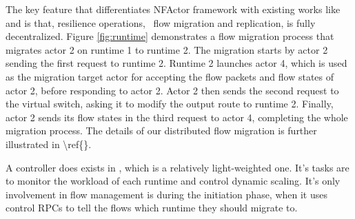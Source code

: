 The key feature that differentiates NFActor framework with existing works like \cite{gember2015opennf} and \cite{rajagopalan2013split} is that, resilience operations, \ie~flow migration and replication, is fully decentralized. Figure \ref{fig:runtime} demonstrates a flow migration process that migrates actor 2 on runtime 1 to runtime 2. \ac{The migration starts by actor 2 sending the first request to runtime 2. Runtime 2 launches actor 4, which is used as the migration target actor for accepting the flow packets and flow states of actor 2, before responding to actor 2. Actor 2 then sends the second request to the virtual switch, asking it to modify the output route to runtime 2. Finally, actor 2 sends its flow states in the third request to actor 4, completing the whole migration process. The details of our distributed flow migration is further illustrated in \ref{}.} 

A controller does exists in \nfactor, which is a relatively light-weighted one. It's tasks are to monitor the workload of each runtime and control dynamic scaling. It's only involvement in flow management is during the initiation phase, when it uses control RPCs to tell the flows which runtime they should migrate to.



